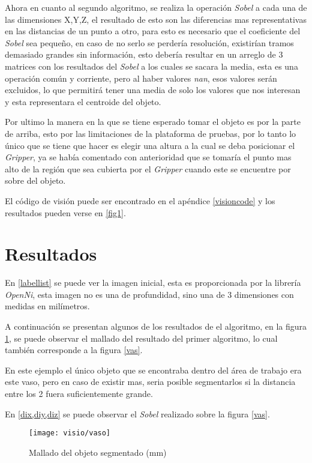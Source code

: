     Ahora en cuanto al segundo algoritmo, se realiza la operación \textit{Sobel} a cada una de las dimensiones X,Y,Z, el resultado de esto son las diferencias mas representativas en las distancias de un punto a otro, para esto es necesario que el coeficiente del \textit{Sobel} sea pequeño, en caso de no serlo se perdería resolución, existirían tramos demasiado grandes sin información, esto debería resultar en un arreglo de 3 matrices con los resultados del \textit{Sobel} a los cuales se sacara la media, esta es una operación común y corriente, pero al haber valores \textit{nan}, esos valores serán excluidos, lo que permitirá tener una media de solo los valores que nos interesan y esta representara el centroide del objeto.
    
    Por ultimo la manera en la que se tiene esperado tomar el objeto es por la parte de arriba, esto por las limitaciones de la plataforma de pruebas, por lo tanto lo único que se tiene que hacer es elegir una altura a la cual se deba posicionar el \textit{Gripper}, ya se había comentado con anterioridad que se tomaría el punto mas alto de la región que sea cubierta por el \textit{Gripper} cuando este se encuentre por sobre del objeto. 
    
    El código de visión puede ser encontrado en el apéndice \ref{visioncode} y los resultados pueden verse en \cref{fig1}.
    
    \section{Resultados}
    
    En \cref{labellist} se puede ver la imagen inicial, esta es proporcionada por la librería \textit{OpenNi}, esta imagen no es una de profundidad, sino una de 3 dimensiones con medidas en milímetros.
    
    
    A continuación se presentan algunos de los resultados de el algoritmo, en la figura  \ref{vaso}, se puede observar el mallado del resultado del primer algoritmo, lo cual también corresponde a la figura {\tiny }\ref{vas}.
    
    En este ejemplo el único objeto que se encontraba dentro del área de trabajo era este vaso, pero en caso de existir mas, seria posible segmentarlos si la distancia entre los 2 fuera suficientemente grande.
    
    
 En \ref{dix,diy,diz} se puede observar el \textit{Sobel} realizado sobre la figura \ref{vas}.
    
    \begin{figure}[h]
    	\centering
    	\texttt{[image: visio/vaso]}
    	\caption{Mallado del objeto segmentado (mm)}
    	\label{vaso}
    \end{figure}

